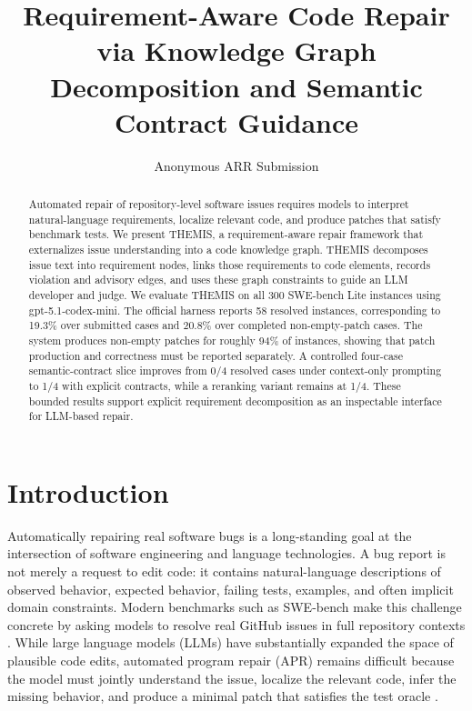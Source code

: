 \documentclass[11pt]{article}
\title{Requirement-Aware Code Repair via Knowledge Graph Decomposition and Semantic Contract Guidance}
\author{Anonymous ARR Submission}
\begin{document}
\maketitle

\begin{abstract}
Automated repair of repository-level software issues requires models to interpret natural-language requirements, localize relevant code, and produce patches that satisfy benchmark tests.  We present THEMIS, a requirement-aware repair framework that externalizes issue understanding into a code knowledge graph.  THEMIS decomposes issue text into requirement nodes, links those requirements to code elements, records violation and advisory edges, and uses these graph constraints to guide an LLM developer and judge.  We evaluate THEMIS on all 300 SWE-bench Lite instances using gpt-5.1-codex-mini.  The official harness reports 58 resolved instances, corresponding to 19.3\% over submitted cases and 20.8\% over completed non-empty-patch cases.  The system produces non-empty patches for roughly 94\% of instances, showing that patch production and correctness must be reported separately.  A controlled four-case semantic-contract slice improves from 0/4 resolved cases under context-only prompting to 1/4 with explicit contracts, while a reranking variant remains at 1/4.  These bounded results support explicit requirement decomposition as an inspectable interface for LLM-based repair.
\end{abstract}

\section{Introduction}
\label{sec:introduction}

Automatically repairing real software bugs is a long-standing goal at the intersection of software engineering and language technologies.  A bug report is not merely a request to edit code: it contains natural-language descriptions of observed behavior, expected behavior, failing tests, examples, and often implicit domain constraints.  Modern benchmarks such as SWE-bench make this challenge concrete by asking models to resolve real GitHub issues in full repository contexts \citep{jimenez-etal-2024-swebench}.  While large language models (LLMs) have substantially expanded the space of plausible code edits, automated program repair (APR) remains difficult because the model must jointly understand the issue, localize the relevant code, infer the missing behavior, and produce a minimal patch that satisfies the test oracle \citep{monperrus-2018-automatic-repair-bibliography,jiang-etal-2023-code-lms-apr}.
\end{document}
